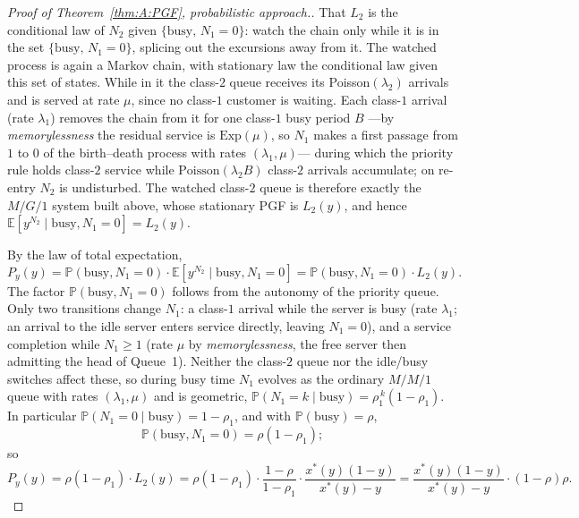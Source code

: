 \begin{proof}[Proof of Theorem~\ref{thm:A:PGF}, probabilistic approach.]
    That $L_2$ is the conditional law of $N_2$ given $\{\text{busy},\,N_1=0\}$: watch the chain only while it is in the set $\{\text{busy},\,N_1=0\}$, splicing out the excursions away from it. The watched process is again a Markov chain, with stationary law the conditional law given this set of states. While in it the class-$2$ queue receives its Poisson$(\lambda_2)$ arrivals and is served at rate $\mu$, since no class-$1$ customer is waiting. Each class-$1$ arrival (rate $\lambda_1$) removes the chain from it for one class-$1$ busy period $B$ ---by \emph{memorylessness} the residual service is $\mathrm{Exp}(\mu)$, so $N_1$ makes a first passage from $1$ to $0$ of the birth--death process with rates $(\lambda_1,\mu)$--- during which the priority rule holds class-$2$ service while $\mathrm{Poisson}(\lambda_2 B)$ class-$2$ arrivals accumulate; on re-entry $N_2$ is undisturbed. The watched class-$2$ queue is therefore exactly the $M/G/1$ system built above, whose stationary PGF is $L_2(y)$, and hence $\mathbb{E}[y^{N_2}\mid\text{busy},N_1=0]=L_2(y)$.

    By the law of total expectation,
    \begin{equation*}
        P_y(y)=\mathbb{P}(\text{busy},N_1=0)\cdot\mathbb{E}[y^{N_2}\mid\text{busy},N_1=0] = \mathbb{P}(\text{busy},N_1=0)\cdot L_2(y).
    \end{equation*}
    The factor $\mathbb{P}(\text{busy},N_1=0)$ follows from the autonomy of the priority queue. Only two transitions change $N_1$: a class-$1$ arrival while the server is busy (rate $\lambda_1$; an arrival to the idle server enters service directly, leaving $N_1=0$), and a service completion while $N_1\ge1$ (rate $\mu$ by \emph{memorylessness}, the free server then admitting the head of Queue~1). Neither the class-$2$ queue nor the idle/busy switches affect these, so during busy time $N_1$ evolves as the ordinary $M/M/1$ queue with rates $(\lambda_1,\mu)$ and is geometric, $\mathbb{P}(N_1=k\mid\text{busy})=\rho_1^{\,k}(1-\rho_1)$. In particular $\mathbb{P}(N_1=0\mid\text{busy})=1-\rho_1$, and with $\mathbb{P}(\text{busy})=\rho$,
    \begin{equation*}
        \mathbb{P}(\text{busy},N_1=0)=\rho(1-\rho_1);
    \end{equation*}
    so
    \begin{equation}
        P_y(y) = \rho(1-\rho_1)\cdot L_2(y) = \rho(1-\rho_1)\cdot\frac{1-\rho}{1-\rho_1} \cdot \frac{x^*(y)(1-y)}{x^*(y) - y} = \frac{x^*(y)(1-y)}{x^*(y) - y} \cdot (1-\rho) \rho.
        \label{eq:A:Py_prob}
    \end{equation}


\end{proof}
